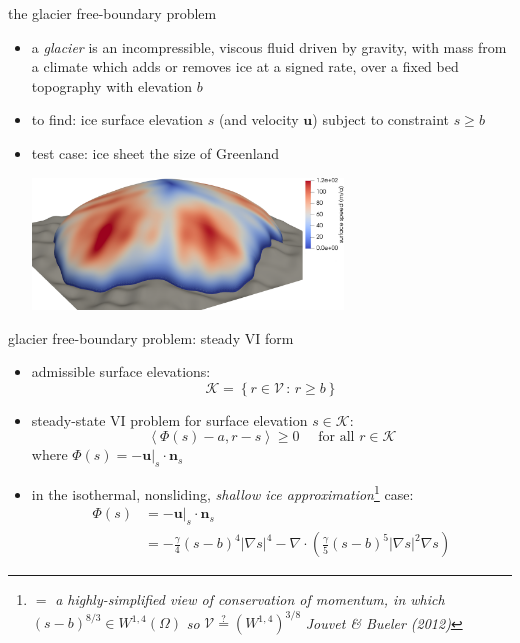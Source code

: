 \documentclass[svgnames,
               hyperref={colorlinks,citecolor=DeepPink4,linkcolor=FireBrick,urlcolor=Maroon},
               usepdftitle=false]  %
               {beamer}
\newcommand{\grad}{\nabla}
\newcommand{\bn}{\mathbf{n}}
\newcommand{\bu}{\mathbf{u}}
\newcommand{\ip}[2]{\left<#1,#2\right>}
\begin{document}
\begin{frame}{the glacier free-boundary problem}

\begin{itemize}
\item a \emph{glacier} is an incompressible, viscous fluid driven by gravity, with mass from a climate which adds or removes ice at a signed rate, over a fixed bed topography with elevation $b$
\item to find: ice surface elevation $s$ (and velocity $\bu$) subject to constraint $\boxed{s\ge b}$
\item test case: ice sheet the size of Greenland

\bigskip
\begin{center}
\includegraphics[width=0.65\textwidth]{../paper/fixfigs/sialev8scene.png}
\end{center}
\end{itemize}
\end{frame}


\begin{frame}{glacier free-boundary problem: steady VI form}

\begin{itemize}
\item admissible surface elevations:
    $$\mathcal{K} = \left\{r \in \mathcal{V} \,:\, r \ge b\right\}$$
\item steady-state VI problem for surface elevation $s\in\mathcal{K}$:
       $$\ip{\Phi(s) - a}{r-s} \ge 0 \quad \text{ for all } r \in \mathcal{K}$$
where $\Phi(s)=- \bu|_s \cdot \bn_s$
\item in the isothermal, nonsliding, \emph{shallow ice approximation}\footnote{$=$ \emph{a highly-simplified view of conservation of momentum, in which} $(s-b)^{8/3} \in W^{1,4}(\Omega)$ \emph{so} $\mathcal{V} \stackrel{?}{=} (W^{1,4})^{3/8}$ \hfill \emph{Jouvet \& Bueler (2012)}} case:
\begin{align*}
\Phi(s) &= - \bu|_s \cdot \bn_s \\
        &= - \frac{\gamma}{4} (s-b)^{4} |\grad s|^{4} - \grad \cdot\left(\frac{\gamma}{5} (s-b)^{5} |\grad s|^{2} \grad s\right)
\end{align*}
\end{itemize}
\end{frame}
\end{document}

